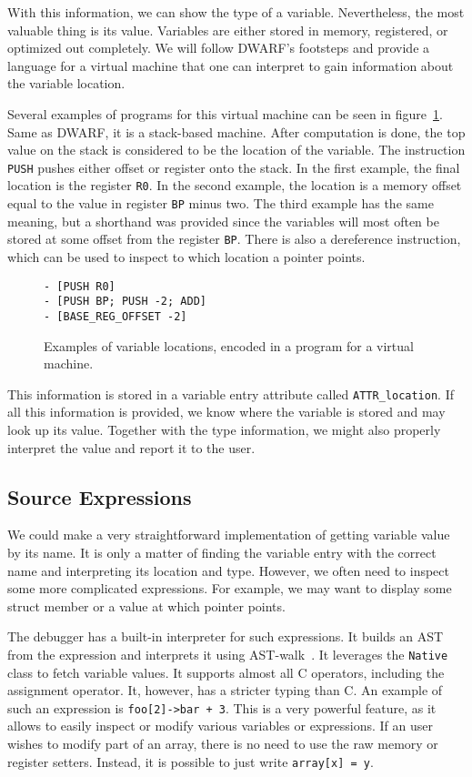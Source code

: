 With this information, we can show the type of a variable. Nevertheless, the
most valuable thing is its value. Variables are either stored in memory,
registered, or optimized out completely. We will follow DWARF's footsteps and
provide a language for a virtual machine that one can interpret to gain
information about the variable location.

Several examples of programs for this virtual machine can be seen in
figure~\ref{fig:t86dbg-vm}. Same as DWARF, it is a stack-based machine. After
computation is done, the top value on the stack is considered to be the
location of the variable. The instruction \texttt{PUSH} pushes either offset or
register onto the stack. In the first example, the final location is the
register \texttt{R0}. In the second example, the location is a memory offset
equal to the value in register \texttt{BP} minus two. The third example has the
same meaning, but a shorthand was provided since the variables will most often
be stored at some offset from the register \texttt{BP}. There is also a
dereference instruction, which can be used to inspect to which location a
pointer points.

\begin{figure}
    \begin{lstlisting}
- [PUSH R0]
- [PUSH BP; PUSH -2; ADD]
- [BASE_REG_OFFSET -2]
    \end{lstlisting}
    \caption{Examples of variable locations, encoded in a program for a virtual
    machine.}
    \label{fig:t86dbg-vm}
\end{figure}

This information is stored in a variable entry attribute called
\texttt{ATTR\_location}. If all this information is provided, we know where the
variable is stored and may look up its value. Together with the type
information, we might also properly interpret the value and report it to the
user.

\subsection{Source Expressions}
We could make a very straightforward implementation of getting variable value
by its name. It is only a matter of finding the variable entry with the correct
name and interpreting its location and type. However, we often need to inspect
some more complicated expressions. For example, we may want to display some
struct member or a value at which pointer points.

The debugger has a built-in interpreter for such expressions. It builds an AST
from the expression and interprets it using
AST-walk~\cite{crafting-interpreters}. It leverages the \texttt{Native} class
to fetch variable values. It supports almost all C operators, including the
assignment operator. It, however, has a stricter typing than C. An example of
such an expression is \texttt{foo[2]->bar + 3}. This is a very powerful
feature, as it allows to easily inspect or modify various variables or
expressions. If an user wishes to modify part of an array, there is no need to
use the raw memory or register setters. Instead, it is possible to just write
\texttt{array[x] = y}.

